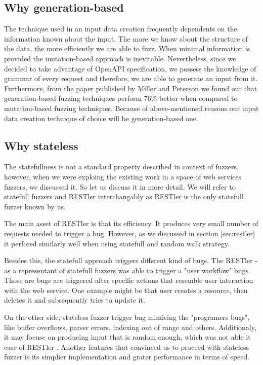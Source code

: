 \subsection{Why generation-based}
The technique used in an input data creation frequently dependents on the information known about the input. The more we know about the structure of the data, the more efficiently we are able to fuzz. When minimal information is provided the mutation-based approach is inevitable. Nevertheless, since we decided to take advantage of OpenAPI specification, we possess the knowledge of grammar of every request and therefore, we are able to generate an input from it. Furthermore, from the paper published by Miller and Peterson we found out that generation-based fuzzing techniques perform 76\% better when compared to mutation-based fuzzing techniques\cite{miller2007analysis}. Because of above-mentioned reasons our input data creation technique of choice will be generation-based one.

\subsection{Why stateless}
The statefullness is not a standard property described in context of fuzzers, however, when we were exploing the existing work in a space of web services fuzzers, we discussed it. So let us discuss it in more detail. We will refer to statefull fuzzers and RESTler interchangably as RESTler is the only statefull fuzzer known by us.

The main asset of RESTler is that its efficiency. It produces very small number of requests needed to trigger a bug. However, as we discussed in section \ref{sec:restler} it perfored similarly well when using statefull and random walk strategy.

Besides this, the statefull approach triggers different kind of bugs. The RESTler - as a representant of statefull fuzzers was able to trigger a "user workflow" bugs. Those are bugs are triggered after specific actions that resemble user interaction with the web service. One example might be that user creates a resource, then deletes it and subsequently tries to update it.

On the other side, stateless fuzzer trigger bug mimicing the "programers bugs", like buffer overflows, parser errors, indexing out of range and others. Additionaly, it may focuse on producing input that is random enough, which was not able it case of RESTler \cite{atlidakis2019restler}. Another features that convinced us to proceed with stateless fuzzer is its simplier implementation and grater performance in terms of speed.


